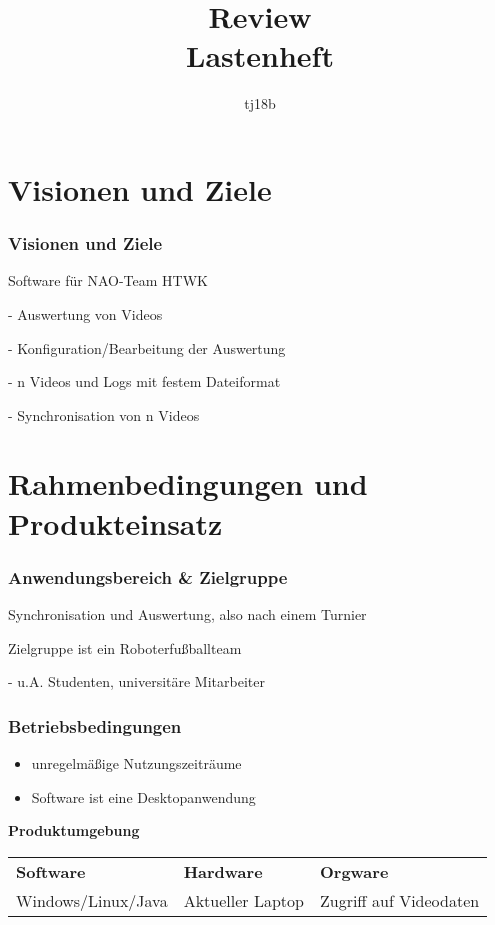 \documentclass[12pt, xcolor=table]{beamer}
\title{Review\\Lastenheft}
\author{tj18b}
\begin{document}
\newcommand{\subitem}[1]{
    {\setlength\itemindent{12pt} \item[-]#1}
}

\maketitle
	
\frame{\tableofcontents[sections={6-10}]}

\section{Visionen und Ziele}
\begin{frame}
	\frametitle{Visionen und Ziele}
	\begin{itemize}
	\item Software für NAO-Team HTWK
		\subitem{Auswertung von Videos}
		\subitem{Konfiguration/Bearbeitung der Auswertung}
		\subitem{n Videos und Logs mit festem Dateiformat}
		\subitem{ Synchronisation von n Videos}
	\end{itemize}
\end{frame}

\section{Rahmenbedingungen und Produkteinsatz}
\begin{frame}
	\frametitle{Anwendungsbereich \& Zielgruppe}
	\begin{itemize}
		\item Synchronisation und Auswertung, also nach einem Turnier
		\item Zielgruppe ist ein Roboterfußballteam
		\subitem{u.A. Studenten, universitäre Mitarbeiter}
	\end{itemize}
\end{frame}

\begin{frame}
	\frametitle{Betriebsbedingungen}
	\begin{itemize}
		\item unregelmäßige Nutzungszeiträume
		\item Software ist eine Desktopanwendung
	\end{itemize}
	\vspace{0.5cm}\textbf{Produktumgebung}\vspace{0.2cm}
	\begin{center}
	\small
	\begin{tabularx}{\framewidth}{lll}
		\textbf{Software}&\textbf{Hardware}&\textbf{Orgware}\\
		Windows/Linux/Java&Aktueller Laptop&Zugriff auf Videodaten\\
	\end{tabularx}
	\end{center}
\end{frame}
\end{document}
